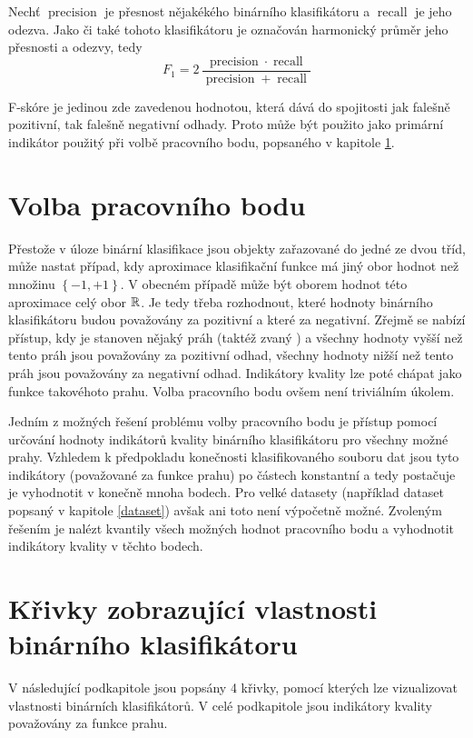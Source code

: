 \begin{define}
	Nechť \( \operatorname{precision} \) je přesnost nějakékého binárního klasifikátoru a \( \operatorname{recall} \) je jeho odezva. Jako  či také  tohoto klasifikátoru je označován harmonický průměr jeho přesnosti a odezvy, tedy
	\[ F_1 = 2 \, \frac{\operatorname{precision} \cdot \operatorname{recall}}{\operatorname{precision} + \operatorname{recall}} \]
\end{define}

F-skóre je jedinou zde zavedenou hodnotou, která dává do spojitosti jak falešně pozitivní, tak falešně negativní odhady. Proto může být použito jako primární indikátor použitý při volbě pracovního bodu, popsaného v kapitole \ref{continuous_aprox}.

\section{Volba pracovního bodu}\label{continuous_aprox}

Přestože v úloze binární klasifikace jsou objekty zařazované do jedné ze dvou tříd, může nastat případ, kdy aproximace klasifikační funkce má jiný obor hodnot než množinu \( \left\{ -1, +1 \right\} \). V obecném případě může být oborem hodnot této aproximace celý obor \( \mathbb R \). Je tedy třeba rozhodnout, které hodnoty binárního klasifikátoru budou považovány za pozitivní a které za negativní. Zřejmě se nabízí přístup, kdy je stanoven nějaký práh (taktéž zvaný ) a všechny hodnoty vyšší než tento práh jsou považovány za pozitivní odhad, všechny hodnoty nižší než tento práh jsou považovány za negativní odhad. Indikátory kvality lze poté chápat jako funkce takovéhoto prahu. Volba pracovního bodu ovšem není triviálním úkolem.

Jedním z možných řešení problému volby pracovního bodu je přístup pomocí určování hodnoty indikátorů kvality binárního klasifikátoru pro všechny možné prahy. Vzhledem k předpokladu konečnosti klasifikovaného souboru dat jsou tyto indikátory (považované za funkce prahu) po částech konstantní a tedy postačuje je vyhodnotit v konečně mnoha bodech. Pro velké datasety (například dataset popsaný v kapitole \ref{dataset}) avšak ani toto není výpočetně možné. Zvoleným řešením je nalézt kvantily všech možných hodnot pracovního bodu a vyhodnotit indikátory kvality v těchto bodech.

\section{Křivky zobrazující vlastnosti binárního klasifikátoru}\label{evaluation_curves}
V následující podkapitole jsou popsány 4 křivky, pomocí kterých lze vizualizovat vlastnosti binárních klasifikátorů. V celé podkapitole jsou indikátory kvality považovány za funkce prahu.

